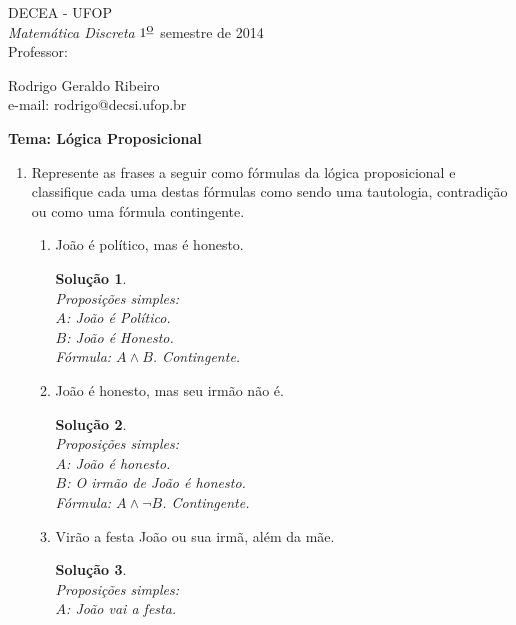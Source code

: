 \documentclass[11pt,a4paper]{report}
\newtheorem*{Solucao}{Solu\c{c}\~ao}
\begin{document}
 
 \hfill DECEA - UFOP \\
{\it Matem\'atica Discreta}
 \hfill $\mbox{1}^{\mbox{\underline{o}}}$ semestre de 2014 \\
Professor: \parbox[t]{14cm}{Rodrigo Geraldo Ribeiro \\
                     e-mail: rodrigo@decsi.ufop.br}
 
 \hfill {\bf Tema: L\'ogica Proposicional}
 
\vspace*{3mm}
\begin{enumerate}
	\item Represente as frases a seguir como f\'ormulas da l\'ogica
          proposicional e classifique cada uma destas f\'ormulas como sendo
          uma tautologia, contradi\c{c}\~ao ou como uma f\'ormula contingente.
	\begin{enumerate}
		\item Jo\~ao \'e pol\'itico, mas \'e honesto.
                  \begin{Solucao}
                    \verb| |\\
                    Proposi\c{c}\~oes simples:\\
                    $A$: Jo\~ao \'e Pol\'itico.\\
                    $B$: Jo\~ao \'e Honesto.\\
                    F\'ormula: $A \land B$. Contingente.
                  \end{Solucao}
		\item Jo\~ao \'e honesto, mas seu irm\~ao n\~ao \'e.
                  \begin{Solucao}
                    \verb| |\\
                    Proposi\c{c}\~oes simples:\\
                    $A$: Jo\~ao \'e honesto.\\
                    $B$: O irm\~ao de Jo\~ao \'e honesto.\\
                    F\'ormula: $A \land \neg B$. Contingente.
                  \end{Solucao}
		\item Vir\~ao a festa Jo\~ao ou sua irm\~a, al\'em da
                  m\~ae.
                  \begin{Solucao}
                    \verb| |\\
                    Proposi\c{c}\~oes simples:\\
                    $A$: Jo\~ao vai a festa.\\

\end{Solucao}
\end{enumerate}
\end{enumerate}
\end{document}
